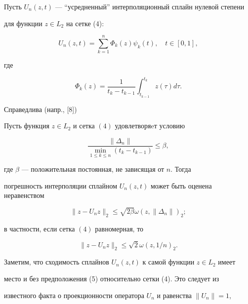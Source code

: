 Пусть $U_n(z,t)$ --- ``усредненный'' интерполяционный сплайн нулевой степени 


для функции $z\in L_2$ на сетке (4): 


$$ 


U_n(z,t)=\sum^n_{k=1}\Phi_k(z)\psi_k(t),\quad t\in[0,1], 


$$ 


где 


$$ 


\Phi_k(z)=\frac{1}{t_k-t_{k-1}}\int^{t_k}_{t_{k-1}}z(\tau)d\tau. 


$$ 


Справедлива (напр., [8]) 


 


 


\begin{lem} 


Пусть функция $z\in L_2$ и сетка $(4)$ удовлетворяeт условию 


\begin{equation} 


\frac{\|\Delta_n\|}{\min\limits_{1\le k\le n}(t_k-t_{k-1})}\le\beta, 


\end{equation} 


где $\beta$ --- положительная постоянная, не зависящая от $n$. Тогда 


погрешность интерполяции сплайном $U_n(z,t)$ может быть оценена неравенством 


$$ 


\|z-U_n z\|_2\le\sqrt{2\beta}\omega(z,\|\Delta_n\|)_2; 


$$ 


в частности, если сетка $(4)$ равномерная, то 


$$ 


\|z-U_n z\|_2\le\sqrt{2}\omega(z,1/n)_2. 


$$ 


\end{lem} 


 


 


Заметим, что сходимость сплайнов $U_n(z,t)$ к самой функции $z\in L_2$ имеет 


место и без предположения (5) относительно сетки (4). Это следует из 


известного факта о проекционности оператора $U_n$ и равенства $\|U_n\|=1$, 


